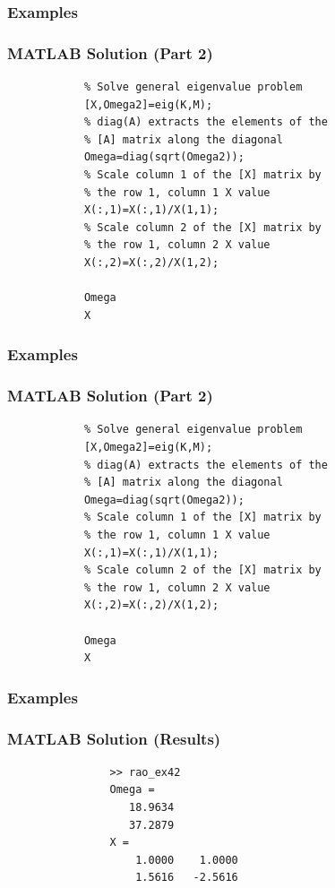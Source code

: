 \documentclass[fleqn]{beamer} %
\newcommand{\sectionIIItitle}{}
\newcommand{\sectionIIsubsectionVtitle}{Examples}
\begin{document}
			\begin{frame}[fragile]
				\frametitle{\sectionIIsubsectionVtitle}
				\bigskip

				  \frametitle{MATLAB Solution (Part 2)}

			  \begin{lstlisting}
			% Solve general eigenvalue problem
			[X,Omega2]=eig(K,M);
			% diag(A) extracts the elements of the
			% [A] matrix along the diagonal
			Omega=diag(sqrt(Omega2));
			% Scale column 1 of the [X] matrix by
			% the row 1, column 1 X value
			X(:,1)=X(:,1)/X(1,1);
			% Scale column 2 of the [X] matrix by
			% the row 1, column 2 X value
			X(:,2)=X(:,2)/X(1,2);

			Omega
			X
			  \end{lstlisting}


				\btVFill 
			\end{frame}


			\begin{frame}[fragile]
				\frametitle{\sectionIIsubsectionVtitle}
				\bigskip

				  \frametitle{MATLAB Solution (Part 2)}

			  \begin{lstlisting}
			% Solve general eigenvalue problem
			[X,Omega2]=eig(K,M);
			% diag(A) extracts the elements of the
			% [A] matrix along the diagonal
			Omega=diag(sqrt(Omega2));
			% Scale column 1 of the [X] matrix by
			% the row 1, column 1 X value
			X(:,1)=X(:,1)/X(1,1);
			% Scale column 2 of the [X] matrix by
			% the row 1, column 2 X value
			X(:,2)=X(:,2)/X(1,2);

			Omega
			X
			  \end{lstlisting}


				\btVFill 
			\end{frame}


			\begin{frame}[fragile]
				\frametitle{\sectionIIsubsectionVtitle}
				\bigskip

				  \frametitle{MATLAB Solution (Results)}

				  \begin{lstlisting}
				>> rao_ex42
				Omega =
				   18.9634
				   37.2879
				X =
				    1.0000    1.0000
				    1.5616   -2.5616
				  \end{lstlisting}

				\btVFill 
			\end{frame}


\end{document}
